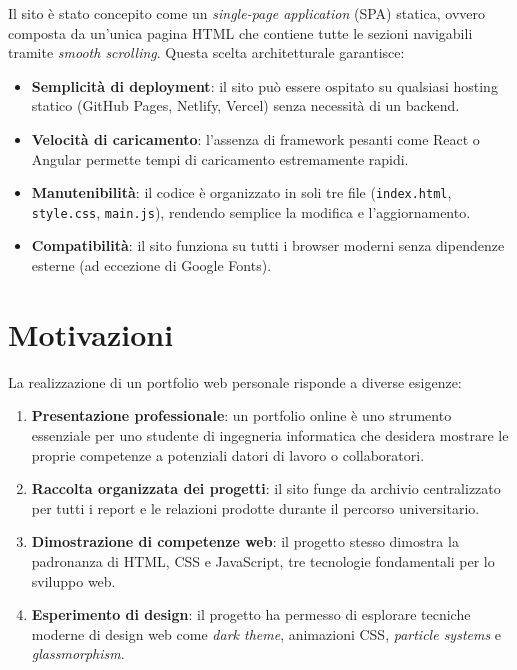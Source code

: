 \documentclass[a4paper,12pt]{report}
\begin{document}
Il sito \`e stato concepito come un \textit{single-page application} (SPA) statica, ovvero composta da un'unica pagina HTML che contiene tutte le sezioni navigabili tramite \textit{smooth scrolling}. Questa scelta architetturale garantisce:

\begin{itemize}[leftmargin=2cm]
    \item \textbf{Semplicit\`a di deployment}: il sito pu\`o essere ospitato su qualsiasi hosting statico (GitHub Pages, Netlify, Vercel) senza necessit\`a di un backend.
    \item \textbf{Velocit\`a di caricamento}: l'assenza di framework pesanti come React o Angular permette tempi di caricamento estremamente rapidi.
    \item \textbf{Manutenibilit\`a}: il codice \`e organizzato in soli tre file (\texttt{index.html}, \texttt{style.css}, \texttt{main.js}), rendendo semplice la modifica e l'aggiornamento.
    \item \textbf{Compatibilit\`a}: il sito funziona su tutti i browser moderni senza dipendenze esterne (ad eccezione di Google Fonts).
\end{itemize}

\section{Motivazioni}

La realizzazione di un portfolio web personale risponde a diverse esigenze:

\begin{enumerate}[leftmargin=2cm]
    \item \textbf{Presentazione professionale}: un portfolio online \`e uno strumento essenziale per uno studente di ingegneria informatica che desidera mostrare le proprie competenze a potenziali datori di lavoro o collaboratori.
    \item \textbf{Raccolta organizzata dei progetti}: il sito funge da archivio centralizzato per tutti i report e le relazioni prodotte durante il percorso universitario.
    \item \textbf{Dimostrazione di competenze web}: il progetto stesso dimostra la padronanza di HTML, CSS e JavaScript, tre tecnologie fondamentali per lo sviluppo web.
    \item \textbf{Esperimento di design}: il progetto ha permesso di esplorare tecniche moderne di design web come \textit{dark theme}, animazioni CSS, \textit{particle systems} e \textit{glassmorphism}.
\end{enumerate}
\end{document}
